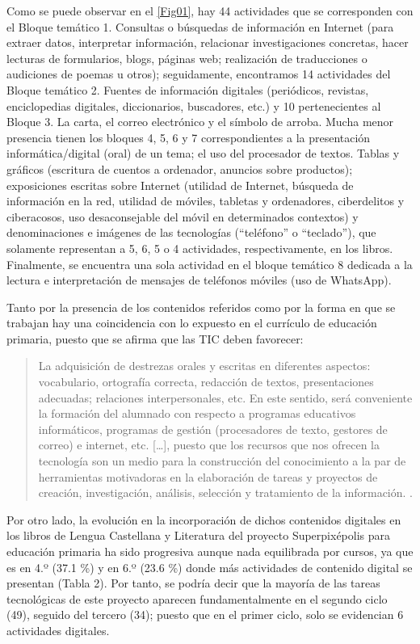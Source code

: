 \documentclass[spanish]{textolivre}
\begin{document}
Como se puede observar en el \cref{Fig01}, hay 44 actividades que se corresponden con el Bloque temático 1. Consultas o búsquedas de información en Internet (para extraer datos, interpretar información, relacionar investigaciones concretas, hacer lecturas de formularios, blogs, páginas web; realización de traducciones o audiciones de poemas u otros); seguidamente, encontramos 14 actividades del Bloque temático 2. Fuentes de información digitales (periódicos, revistas, enciclopedias digitales, diccionarios, buscadores, etc.) y 10 pertenecientes al Bloque 3. La carta, el correo electrónico y el símbolo de arroba. Mucha menor presencia tienen los bloques 4, 5, 6 y 7 correspondientes a la presentación informática/digital (oral) de un tema; el uso del procesador de textos. Tablas y gráficos (escritura de cuentos a ordenador, anuncios sobre productos); exposiciones escritas sobre Internet (utilidad de Internet, búsqueda de información en la red, utilidad de móviles, tabletas y ordenadores, ciberdelitos y ciberacosos, uso desaconsejable del móvil en determinados contextos) y denominaciones e imágenes de las tecnologías (“teléfono” o “teclado”), que solamente representan a 5, 6, 5 o 4 actividades, respectivamente, en los libros. Finalmente, se encuentra una sola actividad en el bloque temático 8 dedicada a la lectura e interpretación de mensajes de teléfonos móviles (uso de WhatsApp). 

Tanto por la presencia de los contenidos referidos como por la forma en que se trabajan hay una coincidencia con lo expuesto en el currículo de educación primaria, puesto que se afirma que las TIC deben favorecer:  

\begin{quote}
    La adquisición de destrezas orales y escritas en diferentes aspectos: vocabulario, ortografía correcta, redacción de textos, presentaciones adecuadas; relaciones interpersonales, etc. En este sentido, será conveniente la formación del alumnado con respecto a programas educativos informáticos, programas de gestión (procesadores de texto, gestores de correo) e internet, etc. […], puesto que los recursos que nos ofrecen la tecnología son un medio para la construcción del conocimiento a la par de herramientas motivadoras en la elaboración de tareas y proyectos de creación, investigación, análisis, selección y tratamiento de la información. \cite[p. 153]{junta_de_andalucia_orden_2015}.
\end{quote}

Por otro lado, la evolución en la incorporación de dichos contenidos digitales en los libros de Lengua Castellana y Literatura del proyecto Superpixépolis para educación primaria ha sido progresiva aunque nada equilibrada por cursos, ya que es en 4.º (37.1 \%) y en 6.º (23.6 \%) donde más actividades de contenido digital se presentan (Tabla 2). Por tanto, se podría decir que la mayoría de las tareas tecnológicas de este proyecto aparecen fundamentalmente en el segundo ciclo (49), seguido del tercero (34); puesto que en el primer ciclo, solo se evidencian 6 actividades digitales.
\end{document}
